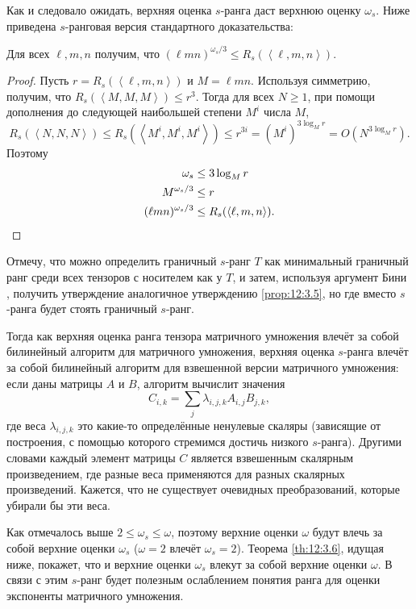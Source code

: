 Как и следовало ожидать, верхняя оценка $s$-ранга даст верхнюю оценку $\omega_s$. Ниже приведена $s$-ранговая версия стандартного доказательства:
\begin{prop}
  \label{prop:12:3.5}Для всех $\ell, m, n$ получим, что $(\ell m n)^{\omega_s / 3} \leq R_s(\left\langle \ell, m, n \right\rangle)$.
\end{prop}
\begin{proof}
  Пусть $r = R_s(\left\langle \ell, m, n \right\rangle)$ и $M = \ell m n$. Используя симметрию, получим, что $R_s(\left\langle M,M,M \right\rangle) \leq r^3$. Тогда для всех $N \geq 1$, при помощи дополнения до следующей наибольшей степени $M^i$ числа $M$,
  \[
  	R_s(\left\langle N,N,N \right\rangle) \leq R_s(\left\langle M^i,M^i,M^i \right\rangle) \leq r^{3i} = (M^i)^{3 \log_M r} = O(N^{3 \log_M r}).
  \]
  Поэтому 
  \begin{align*}
    \omega_s & \leq 3 \log_M r   \\
    M^{\omega_s/3} & \leq r \\
    (\ell m n)^{\omega_s/3} & \leq R_s(\left\langle \ell, m, n \right\rangle).\qedhere
  \end{align*}
\end{proof}

Отмечу, что можно определить граничный $s$-ранг $T$ как минимальный граничный ранг среди всех тензоров с носителем как у $T$, и затем, используя аргумент Бини \cite{Bini}, получить утверждение аналогичное утверждению \ref{prop:12:3.5}, но где вместо $s$-ранга будет стоять граничный $s$-ранг.

Тогда как верхняя оценка ранга тензора матричного умножения влечёт за собой билинейный алгоритм для матричного умножения, верхняя оценка $s$-ранга влечёт за собой билинейный алгоритм для взвешенной версии матричного умножения: если даны матрицы $A$ и $B$, алгоритм вычислит значения 
\[
	C_{i,k} = \sum_j \lambda_{i,j,k} A_{i,j} B_{j,k},
\]
где веса $\lambda_{i,j,k}$ это какие-то определённые ненулевые скаляры (зависящие от построения, с помощью которого стремимся достичь низкого $s$-ранга). Другими словами каждый элемент матрицы $C$ является взвешенным скалярным произведением, где разные веса применяются для разных скалярных произведений. Кажется, что не существует очевидных преобразований, которые убирали бы эти веса.

Как отмечалось выше $2 \leq \omega_s \leq \omega$, поэтому верхние оценки $\omega$ будут влечь за собой верхние оценки $\omega_s$ ($\omega=2$ влечёт $\omega_s=2$). Теорема \ref{th:12:3.6}, идущая ниже, покажет, что и верхние оценки $\omega_s$ влекут за собой верхние оценки $\omega$. В связи с этим $s$-ранг будет полезным ослаблением понятия ранга для оценки экспоненты матричного умножения.


